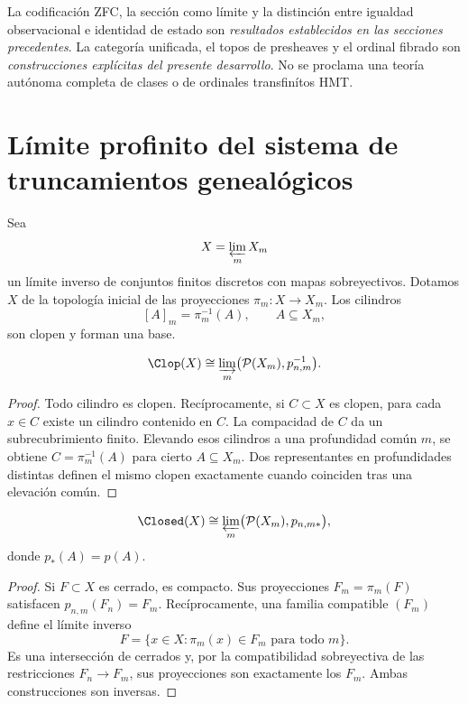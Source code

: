 \begin{remark}
La codificación ZFC, la sección como límite y la distinción entre igualdad
observacional e identidad de estado son
\emph{resultados establecidos en las secciones precedentes}. La categoría unificada, el topos de
presheaves y el ordinal fibrado son
\emph{construcciones explícitas del presente desarrollo}. No se proclama una teoría autónoma completa
de clases o de ordinales transfinítos HMT.
\end{remark}


\section{Límite profinito del sistema de truncamientos genealógicos}

Sea
\[
  X=\varprojlim_mX_m
\]
un límite inverso de conjuntos finitos discretos con mapas sobreyectivos.
Dotamos \(X\) de la topología inicial de las proyecciones
\(\pi_m:X\to X_m\). Los cilindros
\[
  [A]_m=\pi_m^{-1}(A),
  \qquad A\subseteq X_m,
\]
son clopen y forman una base.

\begin{theorem}
\label{p3-83-c45-s2:thm:clopen-power}
\[
  \Clop(X)
  \cong
  \varinjlim_m\bigl(\mathcal P(X_m),p_{n,m}^{-1}\bigr).
\]
\end{theorem}

\begin{proof}
Todo cilindro es clopen. Recíprocamente, si \(C\subset X\) es clopen, para
cada \(x\in C\) existe un cilindro contenido en \(C\). La compacidad de \(C\)
da un subrecubrimiento finito. Elevando esos cilindros a una profundidad
común \(m\), se obtiene \(C=\pi_m^{-1}(A)\) para cierto
\(A\subseteq X_m\). Dos representantes en profundidades distintas definen el
mismo clopen exactamente cuando coinciden tras una elevación común.
\end{proof}

\begin{theorem}
\label{p3-83-c45-s2:thm:closed-power}
\[
  \Closed(X)
  \cong
  \varprojlim_m\bigl(\mathcal P(X_m),p_{n,m*}\bigr),
\]
donde \(p_*(A)=p(A)\).
\end{theorem}

\begin{proof}
Si \(F\subset X\) es cerrado, es compacto. Sus proyecciones
\(F_m=\pi_m(F)\) satisfacen \(p_{n,m}(F_n)=F_m\). Recíprocamente, una familia
compatible \((F_m)\) define el límite inverso
\[
  F=\{x\in X:\pi_m(x)\in F_m\text{ para todo }m\}.
\]
Es una intersección de cerrados y, por la compatibilidad sobreyectiva de las
restricciones \(F_n\to F_m\), sus proyecciones son exactamente los \(F_m\).
Ambas construcciones son inversas.
\end{proof}

